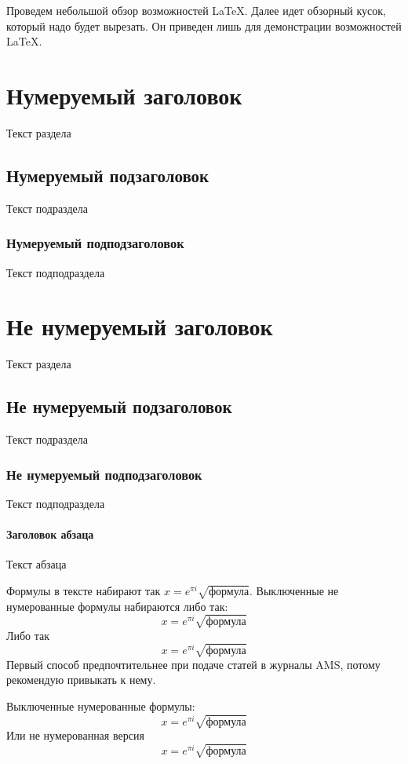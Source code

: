 \documentclass{article}
\begin{document}
\appendix

Проведем небольшой обзор возможностей \LaTeX. Далее идет обзорный кусок, который надо будет вырезать. Он приведен лишь для демонстрации возможностей \LaTeX.

\section{Нумеруемый заголовок}
Текст раздела
\subsection{Нумеруемый подзаголовок}
Текст подраздела
\subsubsection{Нумеруемый подподзаголовок}
Текст подподраздела

\section*{Не нумеруемый заголовок}
Текст раздела
\subsection*{Не нумеруемый подзаголовок}
Текст подраздела
\subsubsection*{Не нумеруемый подподзаголовок}
Текст подподраздела


\paragraph{Заголовок абзаца} Текст абзаца

Формулы в тексте набирают так $x = e^{\pi i}\sqrt{\text{формула}}$. Выключенные не нумерованные формулы набираются либо так:
\[
x = e^{\pi i}\sqrt{\text{формула}}
\]
Либо так
$$
x = e^{\pi i}\sqrt{\text{формула}}
$$
Первый способ предпочтительнее при подаче статей в журналы AMS, потому рекомендую привыкать к нему.

Выключенные нумерованные формулы:
\begin{equation}\label{Equation1}
x = e^{\pi i}\sqrt{\text{формула}}
\end{equation}
Или не нумерованная версия
\begin{equation*}
x = e^{\pi i}\sqrt{\text{формула}}
\end{equation*}
\end{document}
